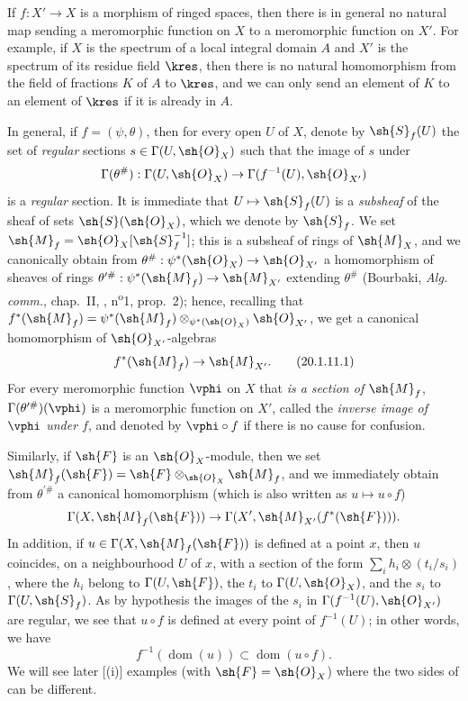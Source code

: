 \begin{env}[20.1.11]
\label{IV.20.1.11}
If $f:X'\to X$ is a morphism of ringed spaces, then there is in general no natural map sending a meromorphic function on $X$ to a meromorphic function on $X'$.
For example, if $X$ is the spectrum of a local integral domain $A$ and $X'$ is the spectrum of its residue field $\kres$, then there is no natural homomorphism from the field of fractions $K$ of $A$ to $\kres$, and we can only send an element of $K$ to an element of $\kres$ if it is already in $A$.

In general, if $f=(\psi,\theta)$, then for every open $U$ of $X$, denote by $\sh{S}_f(U)$ the set of \emph{regular} sections $s\in\Gamma(U,\sh{O}_X)$ such that the image of $s$ under
\[
  \Gamma(\theta^\#):\Gamma(U,\sh{O}_X)\to\Gamma(f^{-1}(U),\sh{O}_{X'})
\]
is a \emph{regular} section.
It is immediate that $U\mapsto\sh{S}_f(U)$ is a \emph{subsheaf} of the sheaf of sets $\sh{S}(\sh{O}_X)$, which we denote by $\sh{S}_f$.
We set $\sh{M}_f=\sh{O}_X[\sh{S}_f^{-1}]$;
this is a subsheaf
of rings of $\sh{M}_X$, and we canonically obtain from $\theta^\#:\psi^*(\sh{O}_X)\to\sh{O}_{X'}$ a homomorphism of sheaves of rings $\theta^{\prime\#}:\psi^*(\sh{M}_f)\to\sh{M}_{X'}$ extending $\theta^\#$ (Bourbaki, \emph{Alg. comm.}, chap.~II, , n\textsuperscript{o}1, prop.~2);
hence, recalling that $f^*(\sh{M}_f)=\psi^*(\sh{M}_f)\otimes_{\psi^*(\sh{O}_X)}\sh{O}_{X'}$,
we get a canonical homomorphism of $\sh{O}_{X'}$-algebras
\[
\label{IV.20.1.11.1}
  f^*(\sh{M}_f)\to\sh{M}_{X'}.
  \tag{20.1.11.1}
\]
For every meromorphic function $\vphi$ on $X$ that \emph{is a section of $\sh{M}_f$}, $\Gamma(\theta^{\prime\#})(\vphi)$ is a meromorphic function on $X'$, called the \emph{inverse image of $\vphi$ under $f$}, and denoted by $\vphi\circ f$ if there is no cause for confusion.

Similarly, if $\sh{F}$ is an $\sh{O}_X$-module, then we set $\sh{M}_f(\sh{F})=\sh{F}\otimes_{\sh{O}_X}\sh{M}_f$, and we immediately obtain from $\theta^{\prime\#}$ a canonical homomorphism (which is also written as $u\mapsto u\circ f$)
\[
  \Gamma(X,\sh{M}_f(\sh{F}))\to\Gamma(X',\sh{M}_{X'}(f^*(\sh{F}))).
\]
In addition, if $u\in\Gamma(X,\sh{M}_f(\sh{F}))$ is defined  at a point $x$, then $u$ coincides, on a neighbourhood $U$ of $x$, with a section of the form $\sum_i h_i\otimes(t_i/s_i)$, where the $h_i$ belong to $\Gamma(U,\sh{F})$, the $t_i$ to $\Gamma(U,\sh{O}_X)$, and the $s_i$ to $\Gamma(U,\sh{S}_f)$.
As by hypothesis the images of the $s_i$ in $\Gamma(f^{-1}(U),\sh{O}_{X'})$ are regular, we see that $u\circ f$ is defined at every point of $f^{-1}(U)$;
in other words, we have
\[
\label{IV.20.1.11.2}
  f^{-1}(\operatorname{dom}(u))\subset\operatorname{dom}(u\circ f).
  \tag{20.1.11.2}
\]
We will see later [(i)] examples (with $\sh{F}=\sh{O}_X$) where the two sides of  can be different.


\end{env}
